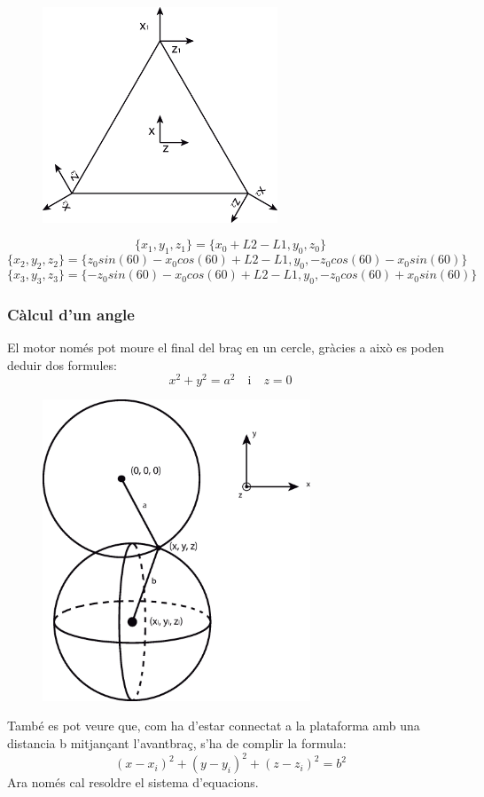 \begin{figure}[h!]
\centering
\includegraphics[width=7cm]{./sketch/canvi_base}
\end{figure}

\[\{x_1,y_1,z_1\}=\{x_0+L2-L1,y_0,z_0\}\]
\[\{x_2,y_2,z_2\}=\{z_0sin(60)-x_0cos(60)+L2-L1,y_0,-z_0cos(60)-x_0sin(60)\}\]
\[\{x_3,y_3,z_3\}=\{-z_0sin(60)-x_0cos(60)+L2-L1,y_0,-z_0cos(60)+x_0sin(60)\}\]

\subsubsection{Càlcul d'un angle}

El motor només pot moure el final del braç en un cercle, gràcies a això es poden deduir dos formules:\[x^2+y^2=a^2 \quad \textrm{i} \quad z=0\]

\begin{figure}[h!]
\centering
\includegraphics[width=8cm]{./sketch/calcul_angle}
\end{figure}

També es pot veure que, com ha d'estar connectat a la plataforma amb una distancia b mitjançant l'avantbraç, s'ha de complir la formula: \[(x-x_i)^2+(y-y_i)^2+(z-z_i)^2=b^2\]
Ara només cal resoldre el sistema d'equacions.

